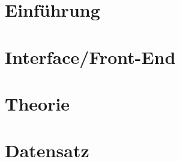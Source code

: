 \documentclass[12pt,ngerman,seminar]{dbvstudentwork}
\begin{document}
	
	\begin{dbvstudentworkTitlepage}
		
		
		
		
		\Deadline{\today}
		
		
	\end{dbvstudentworkTitlepage}
	
	\tableofcontents
	\clearpage
	
	
	\section{Einführung}
	\label{sec:introduction}
		
	
	\section{Interface/Front-End}
	\label{sec:frontend}
		
	\section{Theorie}
	\label{sec:theorie}
		
	
	\section{Datensatz}
	\label{sec:dataset}
		
		
\end{document}

